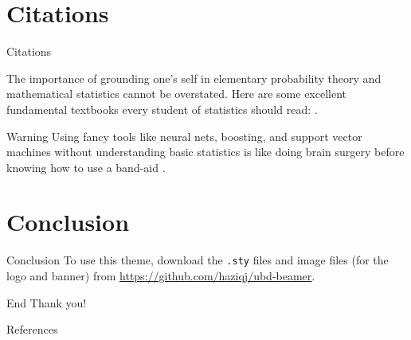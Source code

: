\documentclass[]{beamer}
\begin{document}
\section{Citations}

\begin{frame}{Citations}
	
	The importance of grounding one's self in elementary probability theory and mathematical statistics cannot be overstated.
	Here are some excellent fundamental textbooks every student of statistics should read: \citet{casella2002statistical,	pawitan2001all, wasserman2013all}.
	
	
	\begin{alertblock}{Warning}
		Using fancy tools like neural nets, boosting, and support vector machines without understanding basic statistics is like doing brain surgery before knowing how to use a band-aid \citep{wasserman2013all}.
	\end{alertblock}

\end{frame}

\section{Conclusion}

\begin{frame}{Conclusion}
	To use this theme, download the \texttt{.sty} files and image files (for the logo and banner) from \url{https://github.com/haziqj/ubd-beamer}.
\end{frame}

\begin{frame}{End}
\centering
	\Huge Thank you!
\end{frame}

\nocite{*}

    \begin{frame}{References}
    \printbibliography[heading=none]
    \end{frame}
\end{document}
